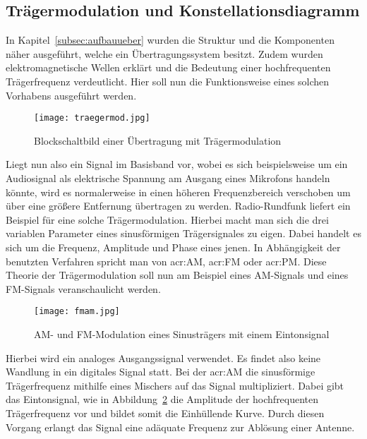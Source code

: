 \subsection{Trägermodulation und Konstellationsdiagramm}
\label{subsec:modulationsarten}

In Kapitel~\ref{subsec:aufbauueber} wurden die Struktur und die Komponenten näher ausgeführt, welche ein Übertragungssystem besitzt. Zudem wurden elektromagnetische Wellen erklärt und die Bedeutung einer hochfrequenten Trägerfrequenz verdeutlicht. Hier soll nun die Funktionsweise eines solchen Vorhabens ausgeführt werden.  

\begin{figure}[H]
	\centering
	\texttt{[image: traegermod.jpg]}
	\caption[Blockschaltbild einer Übertragung mit Trägermodulation]{Blockschaltbild einer Übertragung mit Trägermodulation} 
	\cite{wernerNachrichtentechnikEinfuehrungFuer2010}
	\label{fig:traeger}
\end{figure}
Liegt nun also ein Signal im Basisband vor, wobei es sich beispielsweise um ein Audiosignal als elektrische Spannung am Ausgang eines Mikrofons handeln könnte, wird es normalerweise in einen höheren Frequenzbereich verschoben um über eine größere Entfernung übertragen zu werden. Radio-Rundfunk liefert ein Beispiel für eine solche Trägermodulation. Hierbei macht man sich die drei variablen Parameter eines sinusförmigen Trägersignales zu eigen. Dabei handelt es sich um die Frequenz, Amplitude und Phase eines jenen. In Abhängigkeit der benutzten Verfahren spricht man von \gls{acr:AM}, \gls{acr:FM} oder \gls{acr:PM}.\cite{wernerNachrichtentechnikEinfuehrungFuer2010} Diese Theorie der Trägermodulation soll nun am Beispiel eines AM-Signals und eines FM-Signals veranschaulicht werden. 

\begin{figure}[H]
	\centering
	\texttt{[image: fmam.jpg]}
	\caption[AM- und FM-Modulation eines Sinusträgers mit einem Eintonsignal]{AM- und FM-Modulation eines Sinusträgers mit einem Eintonsignal} 
	\cite{wernerNachrichtentechnikEinfuehrungFuer2010}
	\label{fig:fmam}
\end{figure}

Hierbei wird ein analoges Ausgangssignal verwendet. Es findet also keine Wandlung in ein digitales Signal statt. Bei der \gls{acr:AM}  die sinusförmige Trägerfrequenz mithilfe eines Mischers auf das Signal multipliziert. Dabei gibt das Eintonsignal, wie in Abbildung~\ref{fig:fmam} die Amplitude der hochfrequenten Trägerfrequenz vor und bildet somit die Einhüllende Kurve. Durch diesen Vorgang erlangt das Signal eine adäquate Frequenz zur Ablösung einer Antenne.\cite{klostermeyerDigitaleModulation2001}\cite{heuermannHochfrequenztechnikKomponentenFuer2018}

